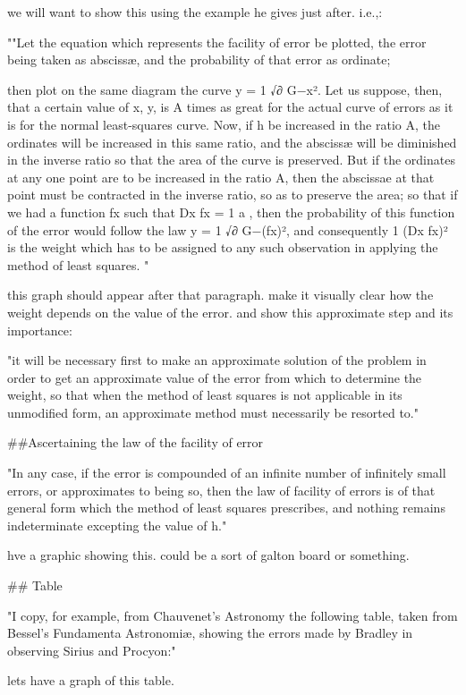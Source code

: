 we will want to show this using the example he gives just after. i.e.,:

""Let the equation which represents the facility of error be plotted, the error being taken as abscissæ, and the probability of that error as ordinate;

then plot on the same diagram the curve y = 
1
√∂
 G−x². Let us suppose, then, that a certain value of x, y, is A times as great for the actual curve of errors as it is for the normal least-squares curve. Now, if h be increased in the ratio A, the ordinates will be increased in this same ratio, and the abscissæ will be diminished in the inverse ratio so that the area of the curve is preserved. But if the ordinates at any one point are to be increased in the ratio A, then the abscissae at that point must be contracted in the inverse ratio, so as to preserve the area; so that if we had a function fx such that Dx fx = 
1
a
, then the probability of this function of the error would follow the law y = 
1
√∂
 G−(fx)², and consequently 
1
(Dx fx)²
 is the weight which has to be assigned to any such observation in applying the method of least squares. "
 
 
 this graph should appear after that paragraph. make it visually clear how the weight depends on the value of the error.  and show this approximate step and its importance:
 
 "it will be necessary first to make an approximate solution of the problem in order to get an approximate value of the error from which to determine the weight, so that when the method of least squares is not applicable in its unmodified form, an approximate method must necessarily be resorted to."
 
 ##Ascertaining the law of the facility of error

"In any case, if the error is compounded of an infinite number of infinitely small errors, or approximates to being so, then the law of facility of errors is of that general form which the method of least squares prescribes, and nothing remains indeterminate excepting the value of h." 

hve a graphic showing this. could be a sort of galton board or something. 

## Table

"I copy, for example, from Chauvenet’s Astronomy the following table, taken from Bessel’s Fundamenta Astronomiæ, showing the errors made by Bradley in observing Sirius and Procyon:"
 
 lets have a graph of this table.
 
